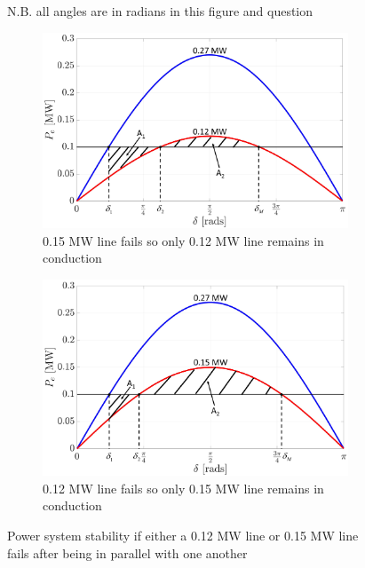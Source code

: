     \subsection{}
        \begin{figure}[tbh!]
            \centering
            \caption*{N.B. all angles are in radians in this figure and question}
            \begin{subfigure}{0.49\textwidth}
                \centering
                 \includegraphics[width=\linewidth]{PEMDT Exam Report/img/12OnlyLine.png}
                 \caption{0.15 MW line fails so only 0.12 MW line remains in conduction}
                 \label{fig: 12onlyline}
            \end{subfigure}
            \hfill
            \begin{subfigure}{0.49\textwidth}
                 \centering
                 \includegraphics[width=\linewidth]{PEMDT Exam Report/img/15OnlyLine.png}
                 \caption{0.12 MW line fails so only 0.15 MW line remains in conduction}
                 \label{fig: 15onlyline}
             \end{subfigure}
             \caption{Power system stability if either a 0.12 MW line or 0.15 MW line fails after being in parallel with one another}
             \label{fig: line loss}
        \end{figure}
